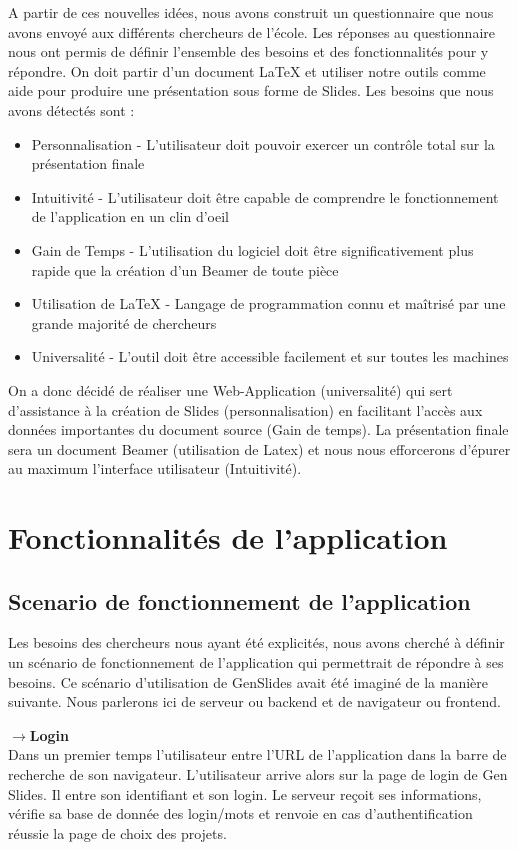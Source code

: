 \documentclass[12pt]{article}
\begin{document}
A partir de ces nouvelles idées, nous avons construit un questionnaire que nous avons envoyé aux différents chercheurs de l'école. Les réponses au questionnaire nous ont permis de définir l'ensemble des besoins et des fonctionnalités pour y répondre. On doit partir d'un document LaTeX  et utiliser notre outils comme aide pour produire une présentation sous forme de Slides.
Les besoins que nous avons détectés sont :
\begin{itemize}
    \item Personnalisation - L'utilisateur doit pouvoir exercer un contrôle total sur la présentation finale
    \item Intuitivité - L'utilisateur doit être capable de comprendre le fonctionnement de l'application en un clin d'oeil
    \item Gain de Temps - L'utilisation du logiciel doit être significativement plus rapide que la création d'un Beamer de toute pièce
    \item Utilisation de LaTeX - Langage de programmation connu et maîtrisé par une grande majorité de chercheurs
    \item Universalité - L'outil doit être accessible facilement et sur toutes les machines 
\end{itemize}
On a donc décidé de réaliser une Web-Application (universalité) qui sert d'assistance à la création de Slides (personnalisation) en facilitant l'accès aux données importantes du document source (Gain de temps). La présentation finale sera un document Beamer (utilisation de Latex) et nous nous efforcerons d'épurer au maximum l'interface utilisateur (Intuitivité).


\section{Fonctionnalités de l'application}
\subsection{Scenario de fonctionnement de l'application}
\noindent
Les besoins des chercheurs nous ayant été explicités, nous avons cherché à définir un scénario de fonctionnement de l'application qui permettrait de répondre à ses besoins. Ce scénario d'utilisation de GenSlides avait été imaginé de la manière suivante. Nous parlerons ici de serveur ou backend et de navigateur ou frontend.

\noindent
$\longrightarrow$\textbf{Login}\\
Dans un premier temps l'utilisateur entre l'URL de l'application dans la barre de recherche de son navigateur. L'utilisateur arrive alors sur la page de login de Gen Slides. Il entre son identifiant et son login. Le serveur reçoit ses informations, vérifie sa base de donnée des login/mots et renvoie en cas d'authentification réussie la page de choix des projets. 
\end{document}
